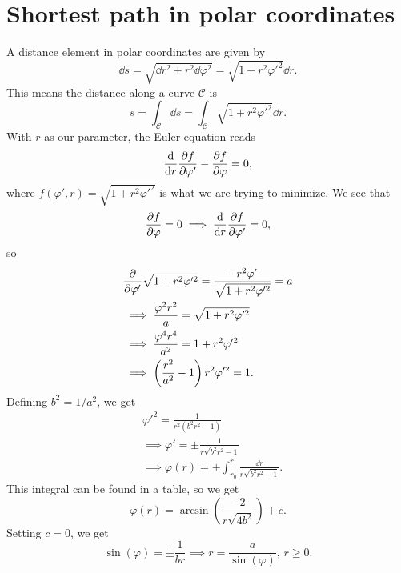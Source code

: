 \documentclass{article}
\newcommand{\Ce}{\mathcal{C}}
\begin{document}
    \section{Shortest path in polar coordinates}
        A distance element in polar coordinates are given by
        \begin{equation*}
            \dd s = \sqrt{\dd r^2 + r^2 \dd \varphi ^2} = \sqrt{1 + r^2 \varphi'^2} \dd r.
        \end{equation*}
        This means the distance along a curve $\Ce$ is
        \begin{equation*}
            s = \int_\Ce \dd s = \int_\Ce \sqrt{1 + r^2 \varphi'^2} \dd r.
        \end{equation*}
        With $r$ as our parameter, the Euler equation reads
        \begin{equation*}
            \dv{r} \pdv{f}{\varphi'} - \pdv{f}{\varphi} = 0,
        \end{equation*}
        where $f(\varphi', r) = \sqrt{1 + r^2 \varphi'^2}$ is what we are trying to minimize. We see that
        \begin{equation*}
            \pdv{f}{\varphi} = 0 \implies \dv{r} \pdv{f}{\varphi'} = 0,
        \end{equation*}
        so 
        \begin{align*}
            &\pdv{\varphi'} \sqrt{1 + r^2 \varphi'^2} = \frac{- r^2 \varphi'}{\sqrt{1 + r^2 \varphi'^2} } = a \\
            &\implies \frac{\varphi^2 r^2}{a} = \sqrt{1 + r^2 \varphi'^2} \\
            &\implies \frac{\varphi^4 r^4}{a^2} = 1 + r^2 \varphi'^2 \\
            &\implies \left( \frac{r^2}{a^2} - 1 \right)r^2 \varphi'^2 = 1.
        \end{align*}
        Defining $b^2 = 1 / a^2$, we get 
        \begin{align*}
            &\varphi'^2 = \frac{1}{r^2(b^2 r^2 - 1)} \\
            & \implies \varphi' = \pm \frac{1}{r \sqrt{b^2 r^2 - 1}} \\
            & \implies \varphi(r) = \pm \int_{r_0}^r \frac{\dd r}{r \sqrt{b^2 r^2 - 1}}.
        \end{align*}
        This integral can be found in a table, so we get
        \begin{equation*}
            \varphi(r) = \arcsin\left( \frac{-2}{r \sqrt{4b^2}}\right) + c.
        \end{equation*}
        Setting $c=0$, we get
        \begin{equation*}
            \sin(\varphi) = \pm \frac{1}{br} \implies r = \frac{a}{\sin(\varphi)}, \,r\geq 0.
        \end{equation*}
\end{document}
